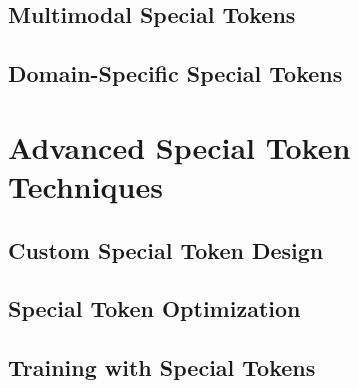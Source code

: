 \documentclass[11pt,oneside]{book}
\theoremstyle{definition}
\theoremstyle{plain}
\theoremstyle{remark}
\begin{document}
\chapter{Multimodal Special Tokens}







\chapter{Domain-Specific Special Tokens}






\part{Advanced Special Token Techniques}

\chapter{Custom Special Token Design}







\chapter{Special Token Optimization}





\chapter{Training with Special Tokens}






\end{document}
